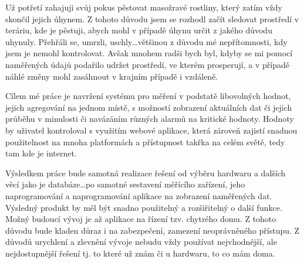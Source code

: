 Už potřetí zahajuji svůj pokus pěstovat masožravé rostliny, který zatím vždy skončil jejich úhynem. Z tohoto důvodu jsem 
se rozhodl začít sledovat prostředí v teráriu, kde je pěstuji, abych mohl v případě úhynu určit z jakého důvodu uhynuly. 
Přehřáli se, umrzli, uschly\ldots většinou z důvodu mé nepřítomnosti, kdy jsem je nemohl kontrolovat. Avšak mnohem radši 
bych byl, kdyby se mi pomocí naměřených údajů podařilo udržet prostředí, ve kterém prosperují, a v případě náhlé změny 
mohl zasáhnout v krajním případě i vzdáleně.

Cílem mé práce je navržení systému pro měření v podstatě libovolných hodnot, jejich agregování na jednom místě, 
s možností zobrazení aktuálních dat či jejich průběhu v minulosti či navázáním různých alarmů na kritické hodnoty. 
Hodnoty by uživatel kontroloval s využitím webové aplikace, která zároveň zajistí snadnou použitelnost na mnoha 
platformách a přístupnost takřka na celém světě, tedy tam kde je internet.

Výsledkem práce bude samotná realizace řešení od výběru hardwaru a dalších věcí jako je databáze\ldots po samotné 
sestavení měřícího zařízení, jeho naprogramování a naprogramování aplikace na zobrazení naměřených dat. Výsledný produkt 
by měl být snadno použitelný a rozšiřitelný o další funkce. Možný budoucí vývoj je až aplikace na řízení tzv. chytrého 
domu. Z tohoto důvodu bude kladen důraz i na zabezpečení, zamezení neoprávněného přístupu. Z důvodů urychlení a zlevnění 
vývoje nebudu vždy používat nejvhodnější, ale nejdostupnější řešení tj. to které už znám či u hardwaru, to co mám doma.

